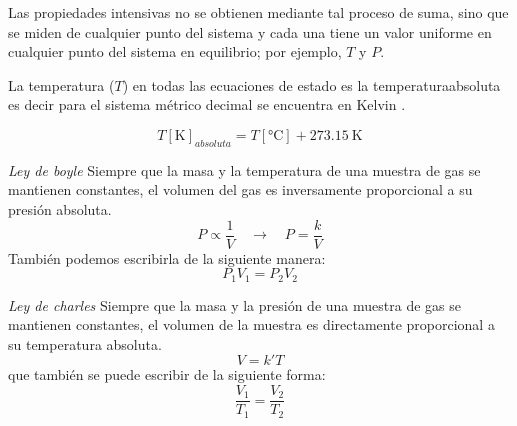 Las propiedades intensivas no se obtienen mediante tal
proceso de su\-ma, sino que se miden de cualquier punto del sistema y cada una tiene un valor
uniforme en cualquier punto del sistema en equilibrio; por ejemplo, $T$ y $P$.

La temperatura ($T$) en todas las ecuaciones de estado es la  \gls{temperaturaabsoluta} es decir para el sistema m\'etrico decimal se encuentra en Kelvin .

\begin{equation}
T[\si{\kelvin}]_{absoluta} = T[\si{\celsius}] + \SI{273.15}{\kelvin}
\end{equation}

\textit{Ley de \gls{boyle}}  Siempre que la masa
y la temperatura de una muestra de gas se mantienen constantes, el volumen del gas es
inversamente proporcional a su presi\'on absoluta.
\begin{equation}
P \propto \frac{1}{V} \quad{ \longrightarrow }\quad  P = \frac{k}{V}
\end{equation}
Tambi\'en podemos escribirla de la siguiente manera:
\begin{equation}
P_1 V_1 = P_2 V_2
\end{equation}

\textit{Ley de \gls{charles}} Siempre que la masa y la presi\'on de una muestra de gas se mantienen constantes, el volumen de la muestra es directamente proporcional a su temperatura absoluta.
\begin{equation}
V= k'T
\end{equation}
que tambi\'en se puede escribir de la siguiente forma:
\begin{equation}
\frac{V_1}{T_1} = \frac{V_2}{T_2}
\end{equation}

